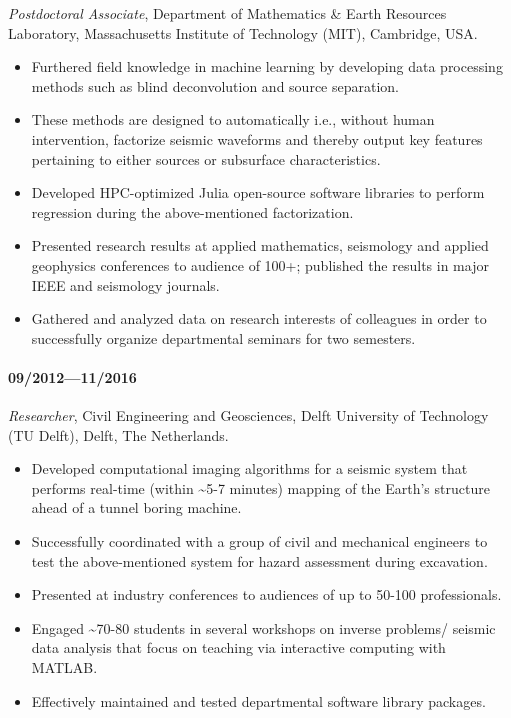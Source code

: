 \documentclass[9pt]{developercv} %
\begin{document}
\emph{Postdoctoral
Associate},
Department
of
Mathematics
\& Earth
Resources
Laboratory,
Massachusetts
Institute
of
Technology
(MIT),
Cambridge,
USA.

\begin{itemize}
\item
  Furthered
  field
  knowledge
  in
  machine
  learning
  by
  developing
  data
  processing
  methods
  such as
  blind
  deconvolution
  and
  source
  separation.
\item
  These
  methods
  are
  designed
  to
  automatically
  i.e.,
  without
  human
  intervention,
  factorize
  seismic
  waveforms
  and
  thereby
  output
  key
  features
  pertaining
  to
  either
  sources
  or
  subsurface
  characteristics.
\item
  Developed
  HPC-optimized
  Julia
  open-source
  software
  libraries
  to
  perform
  regression
  during
  the
  above-mentioned
  factorization.
\item
  Presented
  research
  results
  at
  applied
  mathematics,
  seismology
  and
  applied
  geophysics
  conferences
  to
  audience
  of 100+;
  published
  the
  results
  in major
  IEEE and
  seismology
  journals.
\item
  Gathered
  and
  analyzed
  data on
  research
  interests
  of
  colleagues
  in order
  to
  successfully
  organize
  departmental
  seminars
  for two
  semesters.
\end{itemize}

\paragraph{09/2012---11/2016}\label{section}

\emph{Researcher},
Civil
Engineering
and
Geosciences,
Delft
University
of
Technology
(TU
Delft),
Delft, The
Netherlands.

\begin{itemize}
\item
  Developed
  computational
  imaging
  algorithms
  for a
  seismic
  system
  that
  performs
  real-time
  (within
  \textasciitilde{}5-7
  minutes)
  mapping
  of the
  Earth's
  structure
  ahead of
  a tunnel
  boring
  machine.~
\item
  Successfully
  coordinated
  with a
  group of
  civil
  and
  mechanical
  engineers
  to test
  the
  above-mentioned
  system
  for
  hazard
  assessment
  during
  excavation.
\item
  Presented
  at
  industry
  conferences
  to
  audiences
  of up to
  50-100
  professionals.
\item
  Engaged
  \textasciitilde{}70-80
  students
  in
  several
  workshops
  on
  inverse
  problems/
  seismic
  data
  analysis
  that
  focus on
  teaching
  via
  interactive
  computing
  with
  MATLAB.
\item
  Effectively
  maintained
  and
  tested
  departmental
  software
  library
  packages.
\end{itemize}
\end{document}
